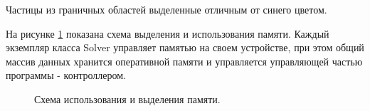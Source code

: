 Частицы из граничных областей выделенные отличным от синего цветом.

На рисунке \ref{fig:dstr_3} показана схема выделения и использования памяти. Каждый экземпляр класса Solver управляет памятью на своем устройстве, при этом общий массив данных хранится оперативной памяти и управляется управляющей частью программы - контроллером.
\begin{figure}[ht]
  \caption{Схема использования и выделения памяти.}
  \label{fig:dstr_3}
\end{figure}



